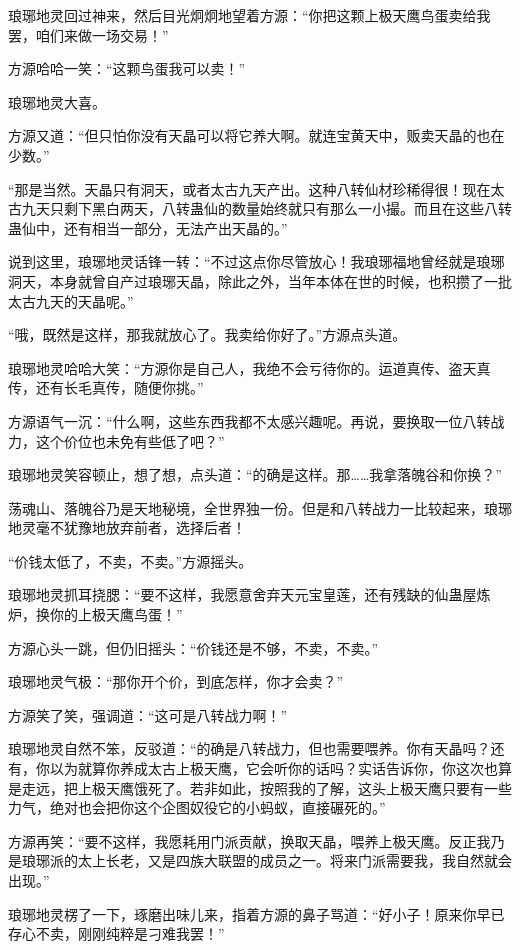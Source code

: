 \begin{this_body}
琅琊地灵回过神来，然后目光炯炯地望着方源：“你把这颗上极天鹰鸟蛋卖给我罢，咱们来做一场交易！”

方源哈哈一笑：“这颗鸟蛋我可以卖！”

琅琊地灵大喜。

方源又道：“但只怕你没有天晶可以将它养大啊。就连宝黄天中，贩卖天晶的也在少数。”

“那是当然。天晶只有洞天，或者太古九天产出。这种八转仙材珍稀得很！现在太古九天只剩下黑白两天，八转蛊仙的数量始终就只有那么一小撮。而且在这些八转蛊仙中，还有相当一部分，无法产出天晶的。”

说到这里，琅琊地灵话锋一转：“不过这点你尽管放心！我琅琊福地曾经就是琅琊洞天，本身就曾自产过琅琊天晶，除此之外，当年本体在世的时候，也积攒了一批太古九天的天晶呢。”

“哦，既然是这样，那我就放心了。我卖给你好了。”方源点头道。

琅琊地灵哈哈大笑：“方源你是自己人，我绝不会亏待你的。运道真传、盗天真传，还有长毛真传，随便你挑。”

方源语气一沉：“什么啊，这些东西我都不太感兴趣呢。再说，要换取一位八转战力，这个价位也未免有些低了吧？”

琅琊地灵笑容顿止，想了想，点头道：“的确是这样。那……我拿落魄谷和你换？”

荡魂山、落魄谷乃是天地秘境，全世界独一份。但是和八转战力一比较起来，琅琊地灵毫不犹豫地放弃前者，选择后者！

“价钱太低了，不卖，不卖。”方源摇头。

琅琊地灵抓耳挠腮：“要不这样，我愿意舍弃天元宝皇莲，还有残缺的仙蛊屋炼炉，换你的上极天鹰鸟蛋！”

方源心头一跳，但仍旧摇头：“价钱还是不够，不卖，不卖。”

琅琊地灵气极：“那你开个价，到底怎样，你才会卖？”

方源笑了笑，强调道：“这可是八转战力啊！”

琅琊地灵自然不笨，反驳道：“的确是八转战力，但也需要喂养。你有天晶吗？还有，你以为就算你养成太古上极天鹰，它会听你的话吗？实话告诉你，你这次也算是走远，把上极天鹰饿死了。若非如此，按照我的了解，这头上极天鹰只要有一些力气，绝对也会把你这个企图奴役它的小蚂蚁，直接碾死的。”

方源再笑：“要不这样，我愿耗用门派贡献，换取天晶，喂养上极天鹰。反正我乃是琅琊派的太上长老，又是四族大联盟的成员之一。将来门派需要我，我自然就会出现。”

琅琊地灵楞了一下，琢磨出味儿来，指着方源的鼻子骂道：“好小子！原来你早已存心不卖，刚刚纯粹是刁难我罢！”


\end{this_body}
